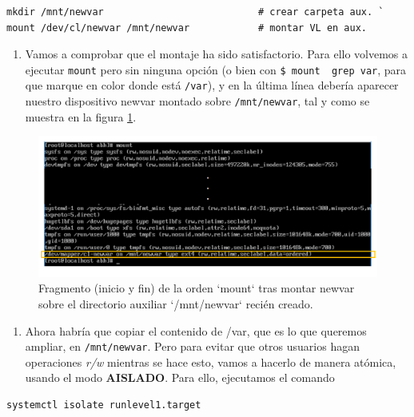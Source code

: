 \documentclass[
]{book}
\providecommand{\tightlist}{%
  \setlength{\itemsep}{0pt}\setlength{\parskip}{0pt}}
\begin{document}
\begin{verbatim}
mkdir /mnt/newvar                           # crear carpeta aux. ` 
mount /dev/cl/newvar /mnt/newvar            # montar VL en aux.
\end{verbatim}

\begin{enumerate}
\def\labelenumi{\arabic{enumi}.}
\setcounter{enumi}{8}
\tightlist
\item
  Vamos a comprobar que el montaje ha sido satisfactorio. Para ello volvemos a ejecutar \texttt{mount} pero sin ninguna opción (o bien con \texttt{\$\ mount\ \textbar{}\ grep\ var}, para que marque en color donde está \texttt{/var}), y en la última línea debería aparecer nuestro dispositivo newvar montado sobre \texttt{/mnt/newvar}, tal y como se muestra en la figura \ref{fig:h}.
\end{enumerate}

\begin{figure}

{\centering \includegraphics[width=0.8\linewidth]{images/h} 

}

\caption{Fragmento (inicio y fin) de la orden `mount` tras montar newvar sobre el directorio auxiliar `/mnt/newvar` recién creado.}\label{fig:h}
\end{figure}

\begin{enumerate}
\def\labelenumi{\arabic{enumi}.}
\setcounter{enumi}{9}
\tightlist
\item
  Ahora habría que copiar el contenido de /var, que es lo que queremos ampliar, en \texttt{/mnt/newvar}. Pero para evitar que otros usuarios hagan operaciones \emph{r/w} mientras se hace esto, vamos a hacerlo de manera atómica, usando el modo \textbf{AISLADO}. Para ello, ejecutamos el comando
\end{enumerate}

\begin{verbatim}
systemctl isolate runlevel1.target
\end{verbatim}
\end{document}

